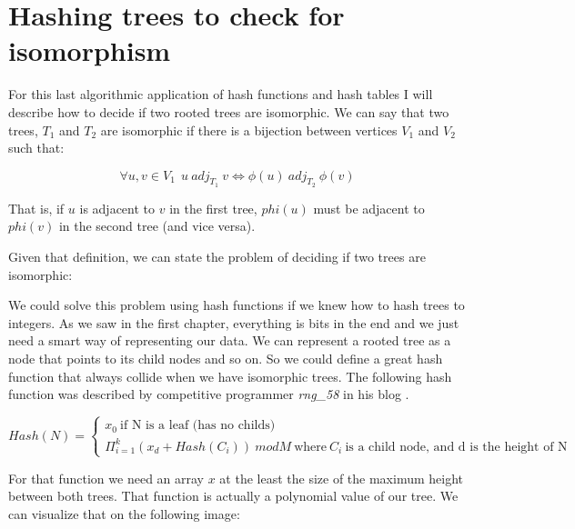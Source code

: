 \section{Hashing trees to check for isomorphism}

For this last algorithmic application of hash functions and hash tables I will describe how to decide if two rooted trees are isomorphic. We can say that two trees,  \( T_1 \) and \( T_2 \) are isomorphic if there is a bijection between vertices \(V_1 \) and \(V_2 \) such that:

\[ \forall u, v \in V_1~ ~ u ~adj_{T_1} ~v \iff \phi(u) ~adj_{T_2} ~\phi(v) \]

That is, if \(u \) is adjacent to \( v \) in the first tree, \( phi(u) \) must be adjacent to \( phi(v) \) in the second tree (and vice versa).

Given that definition, we can state the problem of deciding if two trees are isomorphic:

\medskip


\medskip

We could solve this problem using hash functions if we knew how to hash trees to integers. As we saw in the first chapter, everything is bits in the end and we just need a smart way of representing our data. We can represent a rooted tree as a node that points to its child nodes and so on. So we could define a great hash function that always collide when we have isomorphic trees. The following hash function was described by competitive programmer \textit{rng\_58} in his blog \citep{TreeIsomorphism}.


\[ Hash(N) = \begin{cases} x_0 ~\text{if N is a leaf (has no childs)} \\
    \Pi_{i = 1}^{k} (x_d + Hash(C_i)) ~mod M ~\text{where} ~C_i ~\text{is a child node, and d is the height of N}
  \end{cases} \]

For that function we need an array \( x \) at the least the size of the maximum height between both trees. That function is actually a polynomial value of our tree. We can visualize that on the following image:

